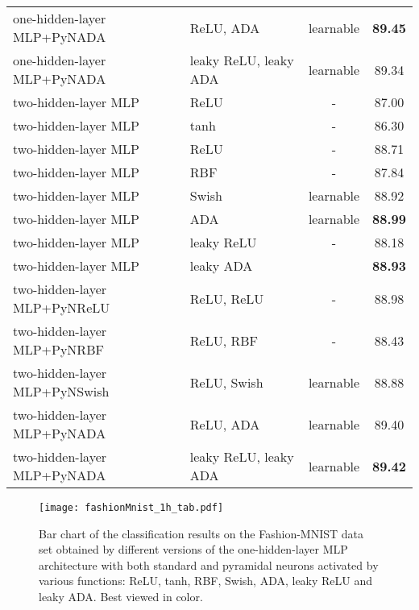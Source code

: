 \documentclass[pdflatex,sn-mathphys]{sn-jnl}
\theoremstyle{thmstyleone}
\theoremstyle{thmstyletwo}\newtheorem{example}{Example}\newtheorem{remark}{Remark}
\theoremstyle{thmstylethree}\newtheorem{definition}{Definition}\DeclareMathOperator{\sinc}{sinc}
\begin{document}
\begin{table}[!t]
{\begin{center}
\begin{tabular}{llcc}
one-hidden-layer MLP+PyNADA       & ReLU, ADA 	    & learnable    & {\bf 89.45}\\
one-hidden-layer MLP+PyNADA       & leaky ReLU, leaky ADA   & learnable & 89.34\\
\toprule
two-hidden-layer MLP~\citep{Xiao-A-2017} & ReLU		& -	                    & 87.00\\
two-hidden-layer MLP~\citep{Xiao-A-2017} & tanh		& -	                    & 86.30\\
\midrule
two-hidden-layer MLP              & ReLU		    & -	                    & 88.71\\
two-hidden-layer MLP              & RBF       	    & -             	    & 87.84\\
two-hidden-layer MLP              & Swish       	& learnable     & 88.92\\
two-hidden-layer MLP              & ADA 		    & learnable    & {\bf 88.99}\\
\midrule
two-hidden-layer MLP              & leaky ReLU	    & -                	    & 88.18\\
two-hidden-layer MLP              & leaky ADA 	    & 	        & {\bf 88.93}\\
\midrule
two-hidden-layer MLP+PyNReLU      & ReLU, ReLU 	    & -     	    	    & 88.98\\
two-hidden-layer MLP+PyNRBF       & ReLU, RBF 	    & -	                    & 88.43\\
two-hidden-layer MLP+PyNSwish     & ReLU, Swish 	& learnable     & 88.88\\
two-hidden-layer MLP+PyNADA       & ReLU, ADA 	    & learnable	& 89.40\\
two-hidden-layer MLP+PyNADA       & leaky ReLU, leaky ADA   & learnable & {\bf 89.42}\\
\bottomrule
\end{tabular}
\end{center}
}
\end{table}

\begin{figure}[!t]
\begin{center}
\centerline{\texttt{[image: fashionMnist\_1h\_tab.pdf]}}
\caption{Bar chart of the classification results on the Fashion-MNIST data set obtained by different versions of the one-hidden-layer MLP \cite{Xiao-A-2017} architecture with both standard and pyramidal neurons activated by various functions: ReLU, tanh, RBF, Swish, ADA, leaky ReLU and leaky ADA. Best viewed in color.}
\label{fig_tab_fashion_1h}
\end{center}
\end{figure}
\end{document}
